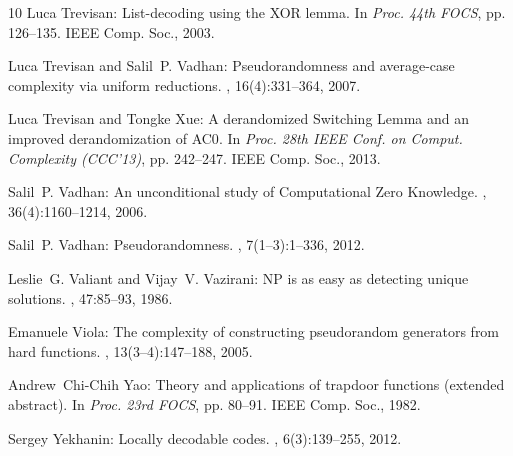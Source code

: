\documentclass[11pt]{article}
\numberwithin{equation}{section}
\theoremstyle{definition}
\theoremstyle{plain}
\begin{document}
\begin{thebibliography}{10}
{\sc Luca Trevisan}: List-decoding using the {XOR} lemma.
\newblock In {\em Proc. 44th FOCS}, pp. 126--135. IEEE Comp. Soc., 2003.

{\sc Luca Trevisan and Salil~P. Vadhan}: Pseudorandomness and average-case
  complexity via uniform reductions.
, 16(4):331--364, 2007.
\newblock [\epfmtdoi{10.1007/s00037-007-0233-x}]

{\sc Luca Trevisan and Tongke Xue}: A derandomized {S}witching {L}emma and an
  improved derandomization of {AC0}.
\newblock In {\em Proc. 28th IEEE Conf. on Comput. Complexity (CCC'13)}, pp.
  242--247. IEEE Comp. Soc., 2013.

{\sc Salil~P. Vadhan}: An unconditional study of {C}omputational {Z}ero
  {K}nowledge.
, 36(4):1160--1214, 2006.
\newblock [\epfmtdoi{10.1137/S0097539705447207}]

{\sc Salil~P. Vadhan}: Pseudorandomness.
, 7(1--3):1--336, 2012.
\newblock [\epfmtdoi{10.1561/0400000010}]

{\sc Leslie~G. Valiant and Vijay~V. Vazirani}: {NP} is as easy as detecting
  unique solutions.
, 47:85--93, 1986.
\newblock [\epfmtdoi{10.1016/0304-3975(86)90135-0}]

{\sc Emanuele Viola}: The complexity of constructing pseudorandom generators
  from hard functions.
, 13(3--4):147--188, 2005.
\newblock [\epfmtdoi{10.1007/s00037-004-0187-1}]

{\sc Andrew~Chi{-}Chih Yao}: Theory and applications of trapdoor functions
  (extended abstract).
\newblock In {\em Proc. 23rd FOCS}, pp. 80--91. IEEE Comp. Soc., 1982.

{\sc Sergey Yekhanin}: Locally decodable codes.
, 6(3):139--255, 2012.
\newblock [\epfmtdoi{10.1561/0400000030}]

\end{thebibliography}
\end{document}

